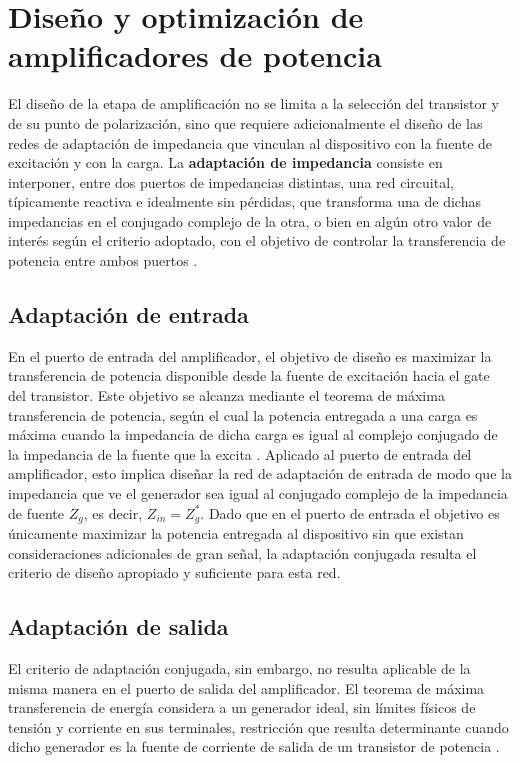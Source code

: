 \section{Diseño y optimización de amplificadores de potencia}
El diseño de la etapa de amplificación no se limita a la selección del transistor y de su punto de polarización, sino que requiere adicionalmente el diseño de las redes de adaptación de impedancia que vinculan al dispositivo con la fuente de excitación y con la carga. La \textbf{adaptación de impedancia} consiste en interponer, entre dos puertos de impedancias distintas, una red circuital, típicamente reactiva e idealmente sin pérdidas, que transforma una de dichas impedancias en el conjugado complejo de la otra, o bien en algún otro valor de interés según el criterio adoptado, con el objetivo de controlar la transferencia de potencia entre ambos puertos \cite[Cap.~5]{pozar2011}.

\subsection{Adaptación de entrada}
En el puerto de entrada del amplificador, el objetivo de diseño es maximizar la transferencia de potencia disponible desde la fuente de excitación hacia el gate del transistor. Este objetivo se alcanza mediante el teorema de máxima transferencia de potencia, según el cual la potencia entregada a una carga es máxima cuando la impedancia de dicha carga es igual al complejo conjugado de la impedancia de la fuente que la excita \cite[pp.~76--78]{pozar2011}. Aplicado al puerto de entrada del amplificador, esto implica diseñar la red de adaptación de entrada de modo que la impedancia que ve el generador sea igual al conjugado complejo de la impedancia de fuente $Z_g$, es decir, $Z_{in} = Z_g^*$. Dado que en el puerto de entrada el objetivo es únicamente maximizar la potencia entregada al dispositivo sin que existan consideraciones adicionales de gran señal, la adaptación conjugada resulta el criterio de diseño apropiado y suficiente para esta red.

\subsection{Adaptación de salida}
El criterio de adaptación conjugada, sin embargo, no resulta aplicable de la misma manera en el puerto de salida del amplificador. El teorema de máxima transferencia de energía considera a un generador ideal, sin límites físicos de tensión y corriente en sus terminales, restricción que resulta determinante cuando dicho generador es la fuente de corriente de salida de un transistor de potencia \cite[pp.~11--14]{cripps2006}.


